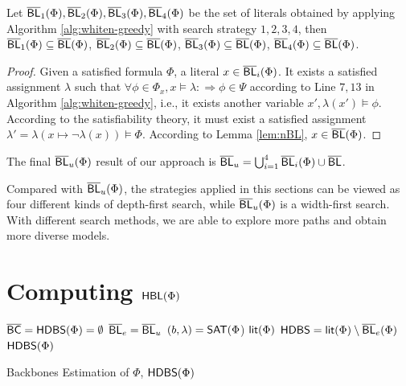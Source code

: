 \begin{theorem}
Let $\overline{\textsf{BL}}_1(\Phi), \overline{\textsf{BL}}_2(\Phi), \overline{\textsf{BL}}_3(\Phi), \overline{\textsf{BL}}_4(\Phi)$ be the set of literals obtained by applying Algorithm \ref{alg:whiten-greedy} with search strategy $1,2,3,4$,
then $\overline{\textsf{BL}}_1(\Phi)\subseteq\overline{\textsf{BL}}(\Phi)$, $\overline{\textsf{BL}}_2(\Phi)\subseteq\overline{\textsf{BL}}(\Phi)$, $\overline{\textsf{BL}}_3(\Phi)\subseteq\overline{\textsf{BL}}(\Phi)$, $\overline{\textsf{BL}}_4(\Phi)\subseteq\overline{\textsf{BL}}(\Phi)$.
\end{theorem}
\begin{proof}
Given a satisfied formula $\Phi$, a literal $x\in \overline{\textsf{BL}}_i(\Phi)$.
It exists a satisfied assignment $\lambda$ such that $\forall\phi\in\Phi_{x}, x\models\lambda: \Longrightarrow \phi\in\Psi$ according to Line $7, 13$ in Algorithm \ref{alg:whiten-greedy}, i.e., it exists another variable $x', \lambda(x')\models\phi$.
According to the satisfiability theory, it must exist a satisfied assignment $\lambda'=\lambda(x\mapsto\neg\lambda(x))\models\Phi$.
According to Lemma \ref{lem:nBL}, $x\in\overline{\textsf{BL}}(\Phi)$.
\end{proof}
The final $\overline{\textsf{BL}}_u(\Phi)$ result of our approach is $\overline{\textsf{BL}}_u=\bigcup_{i=1}^4 \overline{\textsf{BL}}_i(\Phi)\cup \overline{\textsf{BL}}$.

Compared with $\overline{\textsf{BL}}_u(\Phi)$, the strategies applied in this sections can be viewed as four different kinds of depth-first search, while $\overline{\textsf{BL}}_u(\Phi)$ is a width-first search. With different search methods, we are able to explore more paths and obtain more diverse models.

\section{Computing ${\sf HBL}(\Phi)$}



\begin{algorithm}
\SetAlgoShortEnd
\SetFillComment
{}


$\overline{\textsf{BC}}=\textsf{HDBS}(\Phi)=\emptyset$\;
$\overline{\textsf{BL}}_e=\overline{\textsf{BL}}_u$\;
$(b,\lambda)=\textsf{SAT}(\Phi$)\;
 \Return $\textsf{lit}(\Phi)$\;
$\textsf{HDBS}=\textsf{lit}(\Phi)\setminus\overline{\textsf{BL}}_e(\Phi)$\;
\Return $\textsf{HDBS}(\Phi)$\;
\caption{Backbones Estimation of $\Phi$, $\textsf{HDBS}(\Phi)$}
\label{alg:nBLo}
\end{algorithm}

